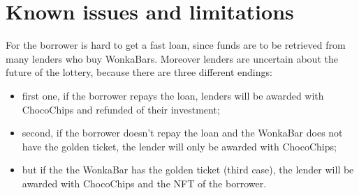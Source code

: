 \section{Known issues and limitations}\label{sec:KnownIssuesAndLimitations}
For the borrower is hard to get a fast loan, since funds are to be retrieved from many lenders who buy WonkaBars. Moreover lenders are uncertain about the future of the lottery, because there are three different endings:
\begin{itemize}
    \item first one, if the borrower repays the loan, lenders will be awarded with ChocoChips and refunded of their investment;
    \item second, if the borrower doesn't repay the loan and the WonkaBar does not have the golden ticket, the lender will only be awarded with ChocoChips;
    \item but if the the WonkaBar has the golden ticket (third case), the lender will be awarded with ChocoChips and the NFT of the borrower.
\end{itemize}


